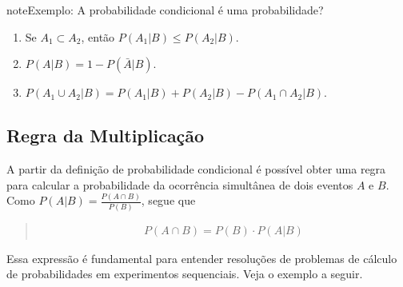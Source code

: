 \begin{sphinxadmonition}{note}{Exemplo: A probabilidade condicional é uma probabilidade?}
\begin{enumerate}
\item {} 
Se \(A_1\subset A_2\),  então \(P(A_1|B)\leq P(A_2|B)\).

\item {} 
\(P(A|B)=1-P(\bar{A}|B)\).

\item {} 
\(P(A_1 \cup A_2|B)=P(A_1|B)+P(A_2|B)-P(A_1\cap A_2|B)\).

\end{enumerate}
\end{sphinxadmonition}


\subsection{Regra da Multiplicação}
\label{\detokenize{PE511-7:id2}}\label{\detokenize{PE511-7:regra-da-multiplicacao}}
A partir da definição de probabilidade condicional é possível obter uma regra para calcular a probabilidade da ocorrência simultânea de dois eventos \(A\)  e \(B\). Como \(P(A|B)=\frac{P(A\cap B)}{P(B)}\), segue que
\begin{quote}
\begin{equation*}
\begin{split}P(A\cap B)=P(B)\cdot P(A|B)\end{split}
\end{equation*}\end{quote}

Essa expressão é fundamental para entender resoluções de problemas de cálculo de probabilidades em experimentos sequenciais. Veja o exemplo a seguir.

